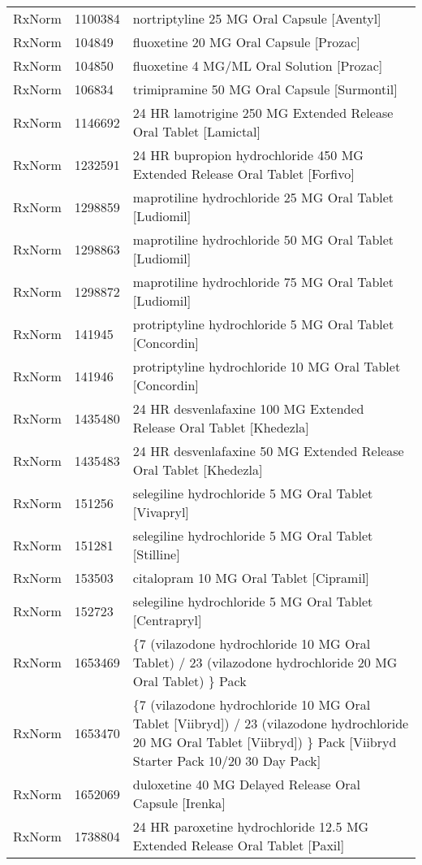\begin{longtable}{p{}p{}p{}}
  RxNorm & 1100384 & nortriptyline 25 MG Oral Capsule [Aventyl] \\ 
  RxNorm & 104849 & fluoxetine 20 MG Oral Capsule [Prozac] \\ 
  RxNorm & 104850 & fluoxetine 4 MG/ML Oral Solution [Prozac] \\ 
  RxNorm & 106834 & trimipramine 50 MG Oral Capsule [Surmontil] \\ 
  RxNorm & 1146692 & 24 HR lamotrigine 250 MG Extended Release Oral Tablet [Lamictal] \\ 
  RxNorm & 1232591 & 24 HR bupropion hydrochloride 450 MG Extended Release Oral Tablet [Forfivo] \\ 
  RxNorm & 1298859 & maprotiline hydrochloride 25 MG Oral Tablet [Ludiomil] \\ 
  RxNorm & 1298863 & maprotiline hydrochloride 50 MG Oral Tablet [Ludiomil] \\ 
  RxNorm & 1298872 & maprotiline hydrochloride 75 MG Oral Tablet [Ludiomil] \\ 
  RxNorm & 141945 & protriptyline hydrochloride 5 MG Oral Tablet [Concordin] \\ 
  RxNorm & 141946 & protriptyline hydrochloride 10 MG Oral Tablet [Concordin] \\ 
  RxNorm & 1435480 & 24 HR desvenlafaxine 100 MG Extended Release Oral Tablet [Khedezla] \\ 
  RxNorm & 1435483 & 24 HR desvenlafaxine 50 MG Extended Release Oral Tablet [Khedezla] \\ 
  RxNorm & 151256 & selegiline hydrochloride 5 MG Oral Tablet [Vivapryl] \\ 
  RxNorm & 151281 & selegiline hydrochloride 5 MG Oral Tablet [Stilline] \\ 
  RxNorm & 153503 & citalopram 10 MG Oral Tablet [Cipramil] \\ 
  RxNorm & 152723 & selegiline hydrochloride 5 MG Oral Tablet [Centrapryl] \\ 
  RxNorm & 1653469 & \{7 (vilazodone hydrochloride 10 MG Oral Tablet) / 23 (vilazodone hydrochloride 20 MG Oral Tablet) \} Pack \\ 
  RxNorm & 1653470 & \{7 (vilazodone hydrochloride 10 MG Oral Tablet [Viibryd]) / 23 (vilazodone hydrochloride 20 MG Oral Tablet [Viibryd]) \} Pack [Viibryd Starter Pack 10/20 30 Day Pack] \\ 
  RxNorm & 1652069 & duloxetine 40 MG Delayed Release Oral Capsule [Irenka] \\ 
  RxNorm & 1738804 & 24 HR paroxetine hydrochloride 12.5 MG Extended Release Oral Tablet [Paxil] \\ 

\end{longtable}
